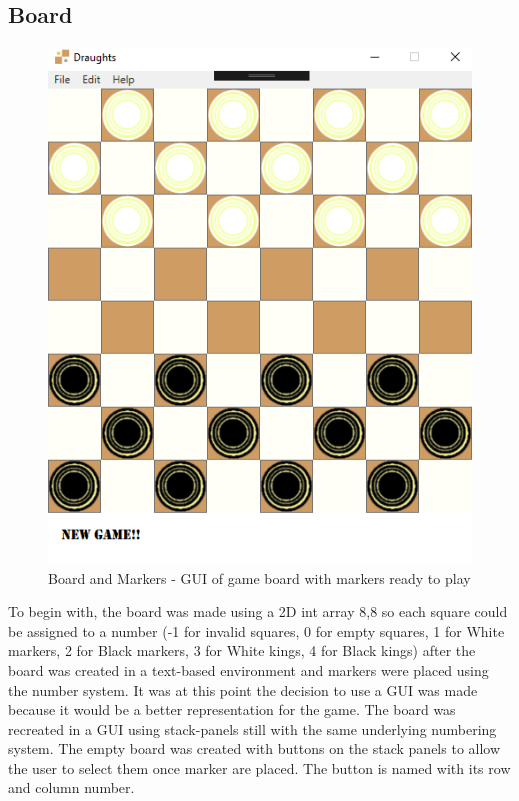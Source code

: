 \documentclass[10pt, a4paper]{article}
\begin{document}
	\subsection{Board}
	\begin{figure}[H]
  	\centering
  	\includegraphics[scale = 0.4]{board}
  	\caption{Board and Markers - GUI of game board with markers ready to play}
  	\label{fig:nonfloat}
	\end{figure}

To begin with, the board was made using a 2D int array 8,8 so each square could be assigned to a number (-1 for invalid squares, 0 for empty squares, 1 for White markers, 2 for Black markers, 3 for White kings, 4 for Black kings) after the board was created in a text-based environment and markers were placed using the number system. It was at this point the decision to use a GUI was made because it would be a better representation for the game. The board was recreated in a GUI using stack-panels still with the same underlying numbering system. The empty board was created with buttons on the stack panels to allow the user to select them once marker are placed. The button is named with its row and column number.
	
\end{document}
